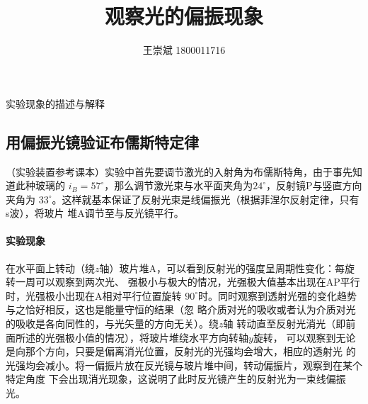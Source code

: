 \documentclass[a4paper]{ctexart}
\title{\textbf{观察光的偏振现象}}
\author{王崇斌 1800011716}
\date{}
\makeatletter
\renewcommand{\section}{\@startsection{section}{1}{0mm}
	{-\baselineskip}{0.5\baselineskip}{\bf\leftline}}
\makeatother
\begin{document}
	\pagestyle{fancy}
	\chead{}
	\rhead{}
	\maketitle
    \thispagestyle{fancy}
    \section{\large{实验现象的描述与解释}}
    \subsection{用偏振光镜验证布儒斯特定律}
    \par 
    （实验装置参考课本）实验中首先要调节激光的入射角为布儒斯特角，由于事先知道此种玻璃的
    $i_{B} = 57^\circ$，那么调节激光束与水平面夹角为$24^\circ$，反射镜P与竖直方向夹角为
    $33^\circ$。这样就基本保证了反射光束是线偏振光（根据菲涅尔反射定律，只有s波），将玻片
    堆A调节至与反光镜平行。
    \paragraph{实验现象}
    在水平面上转动（绕$z$轴）玻片堆A，可以看到反射光的强度呈周期性变化：每旋转一周可以观察到两次光、
    强极小与极大的情况，光强极大值基本出现在AP平行时，光强极小出现在A相对平行位置旋转
    $90^\circ$时。同时观察到透射光强的变化趋势与之恰好相反，这也是能量守恒的结果（忽
    略介质对光的吸收或者认为介质对光的吸收是各向同性的，与光矢量的方向无关）。绕$z$轴
    转动直至反射光消光（即前面所述的光强极小值的情况），将玻片堆绕水平方向转轴$y$旋转，
    可以观察到无论是向那个方向，只要是偏离消光位置，反射光的光强均会增大，相应的透射光
    的光强均会减小。将一偏振片放在反光镜与玻片堆中间，转动偏振片，观察到在某个特定角度
    下会出现消光现象，这说明了此时反光镜产生的反射光为一束线偏振光。
\end{document}
